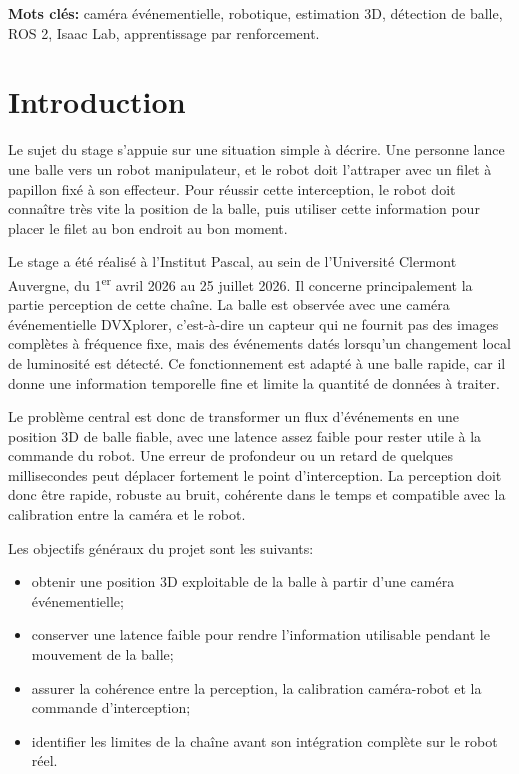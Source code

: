 \documentclass[a4paper,11pt]{report}
\begin{document}
\textbf{Mots clés:} caméra événementielle, robotique, estimation 3D, détection de balle, ROS 2, Isaac Lab, apprentissage par renforcement.

\clearpage

\tableofcontents
\clearpage
{}

\chapter{Introduction}

Le sujet du stage s'appuie sur une situation simple à décrire. Une personne lance une balle vers un robot manipulateur, et le robot doit l'attraper avec un filet à papillon fixé à son effecteur. Pour réussir cette interception, le robot doit connaître très vite la position de la balle, puis utiliser cette information pour placer le filet au bon endroit au bon moment.

Le stage a été réalisé à l'Institut Pascal, au sein de l'Université Clermont Auvergne, du 1\textsuperscript{er} avril 2026 au 25 juillet 2026. Il concerne principalement la partie perception de cette chaîne. La balle est observée avec une caméra événementielle DVXplorer, c'est-à-dire un capteur qui ne fournit pas des images complètes à fréquence fixe, mais des événements datés lorsqu'un changement local de luminosité est détecté. Ce fonctionnement est adapté à une balle rapide, car il donne une information temporelle fine et limite la quantité de données à traiter.

Le problème central est donc de transformer un flux d'événements en une position 3D de balle fiable, avec une latence assez faible pour rester utile à la commande du robot. Une erreur de profondeur ou un retard de quelques millisecondes peut déplacer fortement le point d'interception. La perception doit donc être rapide, robuste au bruit, cohérente dans le temps et compatible avec la calibration entre la caméra et le robot.

Les objectifs généraux du projet sont les suivants:
\begin{itemize}
  \item obtenir une position 3D exploitable de la balle à partir d'une caméra événementielle;
  \item conserver une latence faible pour rendre l'information utilisable pendant le mouvement de la balle;
  \item assurer la cohérence entre la perception, la calibration caméra-robot et la commande d'interception;
  \item identifier les limites de la chaîne avant son intégration complète sur le robot réel.
\end{itemize}
\end{document}
